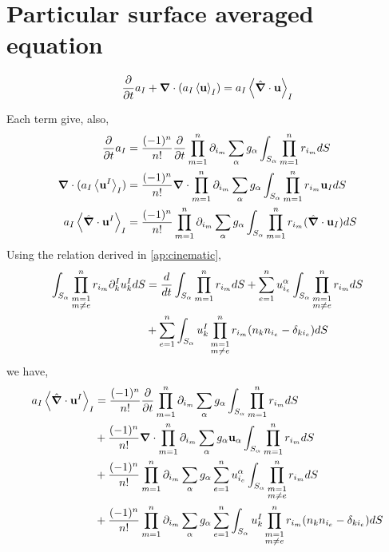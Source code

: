 \section{Particular surface averaged equation}
\begin{equation}
    \frac{\partial}{\partial t} a_I
    + \bm{\nabla} \cdot \left(
        a_I
        \left<\textbf{u}\right>_I
    \right)
    = a_I \left<\hat{\bm{\nabla}} \cdot \textbf{u}\right>_I
\end{equation}

Each term give,
also, 
\begin{align*}
    \frac{\partial}{\partial t} a_I &= \frac{(-1)^{n}}{n!}
        \frac{\partial}{\partial t}
        \prod^{n}_{m=1}
        \partial_{i_m}
        \sum_{\alpha}
        g_{\alpha}
        \int_{S_\alpha}
        \prod_{m=1}^{n} r_{i_m}dS \\
    \bm{\nabla} \cdot (a_I \left<\textbf{u}^I\right>_I) &= \frac{(-1)^{n}}{n!}
        \bm{\nabla}\cdot\prod^{n}_{m=1}
        \partial_{i_m}
        \sum_{\alpha}
        g_{\alpha}
        \int_{S_\alpha}
        \prod_{m=1}^{n} r_{i_m} \textbf{u}_IdS\\
    a_I \left<\hat{\bm{\nabla}} \cdot \textbf{u}^I\right>_I &= \frac{(-1)^{n}}{n!}
        \prod^{n}_{m=1}
        \partial_{i_m}
        \sum_{\alpha}
        g_{\alpha}
        \int_{S_\alpha}
        \prod_{m=1}^{n} r_{i_m} (\hat{\bm{\nabla}} \cdot \textbf{u}_I)dS\\
\end{align*}
Using the relation derived in \ref{ap:cinematic}, 
\begin{align*}
    \int_{S_\alpha} 
    \prod_{\substack{m = 1 \\m \neq e}}^{n} r_{i_m}
    \partial_k^I u^I_k dS 
    &=
    \frac{d}{d t} \int_{S_\alpha} \prod_{m=1}^{n} r_{i_m}dS
    + \sum_{e=1}^n u^\alpha_{i_e} \int_{S_\alpha} 
    \prod_{\substack{m = 1 \\m \neq e}}^{n} r_{i_m}dS \\
    &+ \sum_{e=1}^n \int_{S_\alpha} u^I_k
    \prod_{\substack{m = 1 \\m \neq e}}^{n} r_{i_m}
    (n_kn_{i_e} - \delta_{ki_e}) dS \\
\end{align*}
we have,
\begin{align*}
    a_I \left<\hat{\bm{\nabla}} \cdot \textbf{u}^I\right>_I 
    &= \frac{(-1)^{n}}{n!}
    \frac{\partial}{\partial t} 
    \prod^{n}_{m=1}
    \partial_{i_m}
    \sum_{\alpha}
    g_{\alpha} 
    \int_{S_\alpha} \prod_{m=1}^{n} r_{i_m}dS \\
    &+ \frac{(-1)^{n}}{n!}
    \bm{\nabla} \cdot
    \prod^{n}_{m=1}
    \partial_{i_m}
    \sum_{\alpha}
    g_{\alpha} 
     \textbf{u}_\alpha \int_{S_\alpha} \prod_{m=1}^{n} r_{i_m}dS \\
    & + \frac{(-1)^{n}}{n!}
    \prod^{n}_{m=1}
    \partial_{i_m}
    \sum_{\alpha}
    g_{\alpha} 
    \sum_{e=1}^n u^\alpha_{i_e} \int_{S_\alpha} 
    \prod_{\substack{m = 1 \\m \neq e}}^{n} r_{i_m}dS \\
    & +  \frac{(-1)^{n}}{n!}
    \prod^{n}_{m=1}
    \partial_{i_m}
    \sum_{\alpha}
    g_{\alpha} 
    \sum_{e=1}^n \int_{S_\alpha} u^I_k
    \prod_{\substack{m = 1 \\m \neq e}}^{n} r_{i_m}
    (n_kn_{i_e} - \delta_{ki_e}) dS
\end{align*}
